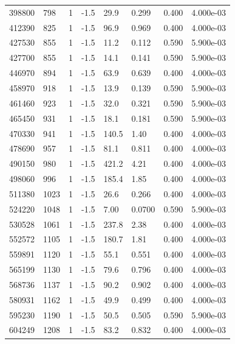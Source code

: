 \documentclass[preview]{standalone}
\begin{document}
{{{{{{{{{{\begin{tabular}{L{1.2cm}C{1.2cm} C{0.3cm}C{0.5cm} C{1.4cm}C{1.4cm} C{1.4cm}C{1.4cm}}
  398800  &   798  & 1     & -1.5 &  29.9  & 0.299  & 0.400 &  4.000e-03   \\ 
  412390  &   825  & 1     & -1.5 &  96.9  & 0.969  & 0.400 &  4.000e-03   \\ 
  427530  &   855  & 1     & -1.5 &  11.2  & 0.112  & 0.590 &  5.900e-03   \\ 
  427700  &   855  & 1     & -1.5 &  14.1  & 0.141  & 0.590 &  5.900e-03   \\ 
  446970  &   894  & 1     & -1.5 &  63.9  & 0.639  & 0.400 &  4.000e-03   \\ 
  458970  &   918  & 1     & -1.5 &  13.9  & 0.139  & 0.590 &  5.900e-03   \\ 
  461460  &   923  & 1     & -1.5 &  32.0  & 0.321  & 0.590 &  5.900e-03   \\ 
  465450  &   931  & 1     & -1.5 &  18.1  & 0.181  & 0.590 &  5.900e-03   \\ 
  470330  &   941  & 1     & -1.5 &  140.5  & 1.40  & 0.400 &  4.000e-03   \\ 
  478690  &   957  & 1     & -1.5 &  81.1  & 0.811  & 0.400 &  4.000e-03   \\ 
  490150  &   980  & 1     & -1.5 &  421.2  & 4.21  & 0.400 &  4.000e-03   \\ 
  498060  &   996  & 1     & -1.5 &  185.4  & 1.85  & 0.400 &  4.000e-03   \\ 
  511380  &  1023  & 1     & -1.5 &  26.6  & 0.266  & 0.400 &  4.000e-03   \\ 
  524220  &  1048  & 1     & -1.5 &  7.00  & 0.0700  & 0.590 &  5.900e-03   \\ 
  530528  &  1061  & 1     & -1.5 &  237.8  & 2.38  & 0.400 &  4.000e-03   \\ 
  552572  &  1105  & 1     & -1.5 &  180.7  & 1.81  & 0.400 &  4.000e-03   \\ 
  559891  &  1120  & 1     & -1.5 &  55.1  & 0.551  & 0.400 &  4.000e-03   \\ 
  565199  &  1130  & 1     & -1.5 &  79.6  & 0.796  & 0.400 &  4.000e-03   \\ 
  568736  &  1137  & 1     & -1.5 &  90.2  & 0.902  & 0.400 &  4.000e-03   \\ 
  580931  &  1162  & 1     & -1.5 &  49.9  & 0.499  & 0.400 &  4.000e-03   \\ 
  595230  &  1190  & 1     & -1.5 &  50.5  & 0.505  & 0.590 &  5.900e-03   \\ 
  604249  &  1208  & 1     & -1.5 &  83.2  & 0.832  & 0.400 &  4.000e-03   \\ 

\end{tabular}}}}}}}}}}}
\end{document}
